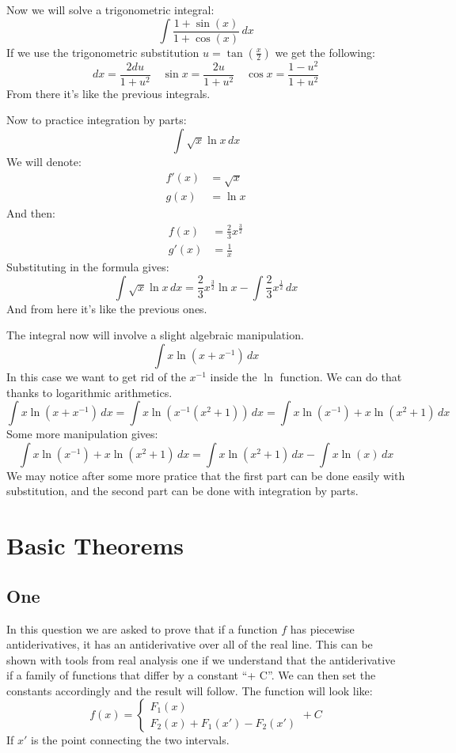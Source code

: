 \documentclass[11pt,a4paper]{article}
\begin{document}
	\newpage
	Now we will solve a trigonometric integral:
	\[
		\int{\frac{1+\sin(x)}{1+\cos(x)}\,dx}
	\]
	If we use the trigonometric substitution $u = \tan(\frac{x}{2})$ we get
	the following:
	\[
		dx = \frac{2du}{1+u^2} \quad 
		\sin x = \frac{2u}{1+u^2} \quad 
		\cos x = \frac{1-u^2}{1+u^2}
	\]
	From there it's like the previous integrals.
	
	\newpage
	
	Now to practice integration by parts:
	\[
		\int{\sqrt{x}\ln{x}\,dx}
	\]
	We will denote:
	\begin{align*}
		f'(x) &= \sqrt{x} \\
		g(x)  &= \ln x
	\end{align*}
	And then:
	\begin{align*}
		f(x) &= \frac{2}{3}x^{\frac{3}{2}} \\
		g'(x)  &= \frac{1}{x}
	\end{align*}
	Substituting in the formula gives:
	\[
		\int{\sqrt{x}\ln{x}\,dx} = 
		\frac{2}{3}x^{\frac{3}{2}}\ln x - 
		\int{\frac{2}{3}x^{\frac{1}{2}}\,dx}
	\]
	And from here it's like the previous ones.
	
	\newpage
	
	The integral now will involve a slight algebraic manipulation.
	\[
		\int{x\ln(x+x^{-1})\,dx}
	\]
	In this case we want to get rid of the $x^{-1}$ inside the $\ln$ function.
	We can do that thanks to logarithmic arithmetics.
	\[
		\int{x\ln(x+x^{-1})\,dx} = 
		\int{x\ln(x^{-1}(x^2+1))\,dx} =
		\int{x\ln(x^{-1}) + x\ln(x^2+1)\,dx}
	\]
	Some more manipulation gives:
	\[
		\int{x\ln(x^{-1}) + x\ln(x^2+1)\,dx} = 
		\int{x\ln(x^2+1)\,dx} - \int{x\ln(x)\,dx}
	\]
	We may notice after some more pratice that the first part can be done
	easily with substitution, and the second part can be done with integration
	by parts.
	
	\newpage
	
	\section{Basic Theorems}
	\subsection*{One}
	In this question we are asked to prove that if a function $f$ has 
	piecewise antiderivatives, it has an antiderivative over all of the real
	line. This can be shown with tools from real analysis one if we understand
	that the antiderivative if a family of functions that differ by a constant
	``+ C''. We can then set the constants accordingly and the result will
	follow. The function will look like:
	\[
		f(x) = \begin{cases}
			F_1(x) \\
			F_2(x) + F_1(x') - F_2(x')
		\end{cases} + C
	\]
	If $x'$ is the point connecting the two intervals.
	
\end{document}
